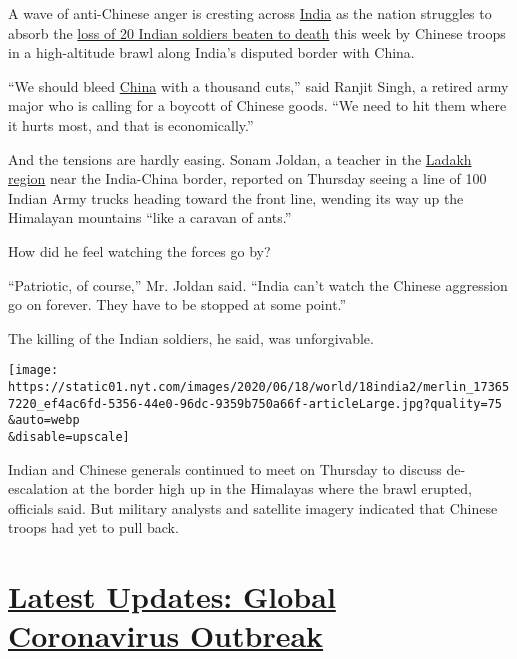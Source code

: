 A wave of anti-Chinese anger is cresting across
\href{https://www.nytimes.com/2020/06/29/world/asia/tik-tok-banned-india-china.html}{India}
as the nation struggles to absorb the
\href{https://www.nytimes.com/2020/06/16/world/asia/indian-china-border-clash.html}{loss
of 20 Indian soldiers beaten to death} this week by Chinese troops in a
high-altitude brawl along India's disputed border with China.

``We should bleed
\href{https://www.nytimes.com/2020/06/29/world/asia/tik-tok-banned-india-china.html}{China}
with a thousand cuts,'' said Ranjit Singh, a retired army major who is
calling for a boycott of Chinese goods. ``We need to hit them where it
hurts most, and that is economically.''

And the tensions are hardly easing. Sonam Joldan, a teacher in the
\href{https://www.nytimes.com/2020/07/11/world/asia/india-china-border-ladakh.html}{Ladakh
region} near the India-China border, reported on Thursday seeing a line
of 100 Indian Army trucks heading toward the front line, wending its way
up the Himalayan mountains ``like a caravan of ants.''

How did he feel watching the forces go by?

``Patriotic, of course,'' Mr. Joldan said. ``India can't watch the
Chinese aggression go on forever. They have to be stopped at some
point.''

The killing of the Indian soldiers, he said, was unforgivable.

\texttt{[image: https://static01.nyt.com/images/2020/06/18/world/18india2/merlin\_173657220\_ef4ac6fd-5356-44e0-96dc-9359b750a66f-articleLarge.jpg?quality=75\\\&auto=webp\\\&disable=upscale]}

Indian and Chinese generals continued to meet on Thursday to discuss
de-escalation at the border high up in the Himalayas where the brawl
erupted, officials said. But military analysts and satellite imagery
indicated that Chinese troops had yet to pull back.

\hypertarget{latest-updates-global-coronavirus-outbreak}{%
\section{\texorpdfstring{\href{https://www.nytimes.com/2020/08/01/world/coronavirus-covid-19.html?action=click\&pgtype=Article\&state=default\&region=MAIN_CONTENT_1\&context=storylines_live_updates}{Latest
Updates: Global Coronavirus
Outbreak}}{Latest Updates: Global Coronavirus Outbreak}}\label{latest-updates-global-coronavirus-outbreak}}

